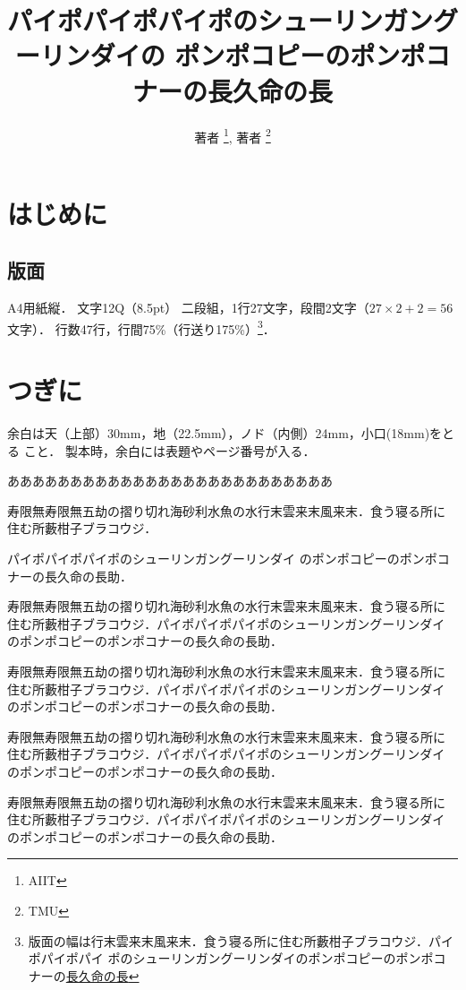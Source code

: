 \documentclass[a4j, 12Q, twocolumn, twoside, draft]{jsarticle}
\title{パイポパイポパイポのシューリンガングーリンダイの
ポンポコピーのポンポコナーの長久命の長
}
\author{著者 \thanks{AIIT}, 著者 \thanks{TMU}}
\begin{document}
\section{はじめに}
\subsection{版面}
A4用紙縦．
文字12Q（8.5pt）
二段組，1行27文字，段間2文字（$27 \times 2 + 2 = 56$文字）．
行数47行，行間75\%（行送り175\%）\footnote{版面の幅は行末雲来末風来末．食う寝る所に住む所藪柑子ブラコウジ．パイポパイポパイ
ポのシューリンガングーリンダイのポンポコピーのポンポコナーの\underline{長久命の長}
}．


\section{つぎに}

余白は天（上部）30mm，地（22.5mm），ノド（内側）24mm，小口(18mm)をとる
こと．
製本時，余白には表題やページ番号が入る．

 {\Large ああああああああああああああああああああああああああ}

寿限無寿限無五劫の摺り切れ海砂利水魚の水行末雲来末風来末．食う寝る所に
住む所藪柑子ブラコウジ．

パイポパイポパイポのシューリンガングーリンダイ
のポンポコピーのポンポコナーの長久命の長助．

寿限無寿限無五劫の摺り切れ海砂利水魚の水行末雲来末風来末．食う寝る所に
住む所藪柑子ブラコウジ．パイポパイポパイポのシューリンガングーリンダイ
のポンポコピーのポンポコナーの長久命の長助．

寿限無寿限無五劫の摺り切れ海砂利水魚の水行末雲来末風来末．食う寝る所に
住む所藪柑子ブラコウジ．パイポパイポパイポのシューリンガングーリンダイ
のポンポコピーのポンポコナーの長久命の長助．

寿限無寿限無五劫の摺り切れ海砂利水魚の水行末雲来末風来末．食う寝る所に
住む所藪柑子ブラコウジ．パイポパイポパイポのシューリンガングーリンダイ
のポンポコピーのポンポコナーの長久命の長助．

寿限無寿限無五劫の摺り切れ海砂利水魚の水行末雲来末風来末．食う寝る所に
住む所藪柑子ブラコウジ．パイポパイポパイポのシューリンガングーリンダイ
のポンポコピーのポンポコナーの長久命の長助．
\end{document}
